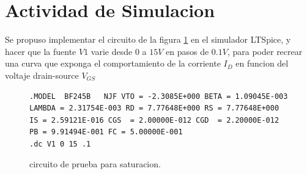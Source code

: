   \section{Actividad de Simulacion}
    Se propuso implementar el circuito de la figura \ref{crkt:jfet-sat} en el simulador LTSpice, y hacer que la fuente
    $V1$ varie desde $0$ a $15V$ en pasos de $0.1V$, para poder recrear una curva que exponga el comportamiento de la
    corriente $I_D$ en funcion del voltaje drain-source $V_{GS}$ 
    \begin{figure}[!ht]
      \centering
      \begin{minipage}{0.45\textwidth}
        \caption{circuito de prueba para saturacion.}
        \label{crkt:jfet-sat}
      \end{minipage}
      \hfill
      \begin{minipage}{0.45\textwidth}
        \begin{lstlisting}[style=ltspice, caption={Parámetros de simulación LTspice}, label=list:jfet-sat]
.MODEL  BF245B   NJF VTO = -2.3085E+000 BETA = 1.09045E-003 LAMBDA = 2.31754E-003 RD = 7.77648E+000 RS = 7.77648E+000 IS = 2.59121E-016 CGS  = 2.00000E-012 CGD  = 2.20000E-012 PB = 9.91494E-001 FC = 5.00000E-001
.dc V1 0 15 .1
        \end{lstlisting}
      \end{minipage}
    \end{figure}

